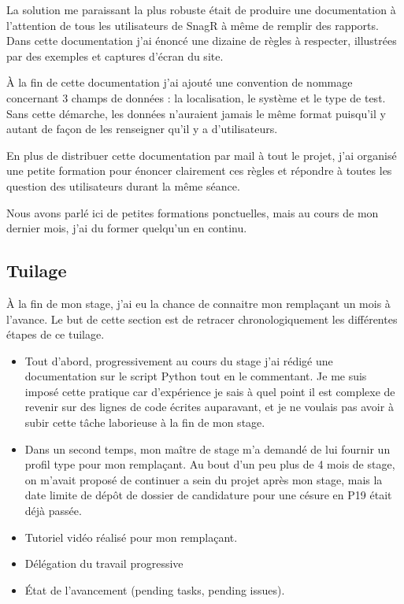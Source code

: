 La solution me paraissant la plus robuste était de produire une documentation à l'attention de tous les utilisateurs de \gls{SnagR} à même de remplir des rapports. 
Dans cette documentation j'ai énoncé une dizaine de règles à respecter, illustrées par des exemples et captures d'écran du site. 

À la fin de cette documentation j'ai ajouté une convention de nommage concernant 3 champs de données : la localisation, le système et le type de test. 
Sans cette démarche, les données n'auraient jamais le même format puisqu'il y autant de façon de les renseigner qu'il y a d'utilisateurs.

En plus de distribuer cette documentation par mail à tout le projet, j'ai organisé une petite formation pour énoncer clairement ces règles et répondre à toutes les question des utilisateurs durant la même séance.

Nous avons parlé ici de petites formations ponctuelles, mais au cours de mon dernier mois, j'ai du former quelqu'un en continu.

\newpage
\subsection{Tuilage}

À la fin de mon stage, j'ai eu la chance de connaitre mon remplaçant un mois à l'avance. Le but de cette section est de retracer chronologiquement les différentes étapes de ce tuilage.

\begin{itemize}
\item Tout d'abord, progressivement au cours du stage j'ai rédigé une documentation sur le script Python tout en le commentant. Je me suis imposé cette pratique car d'expérience je sais à quel point il est complexe de revenir sur des lignes de code écrites auparavant, et je ne voulais pas avoir à subir cette tâche laborieuse à la fin de mon stage.
\item Dans un second temps,  mon maître de stage m'a demandé de lui fournir un profil type pour mon remplaçant. Au bout d'un peu plus de 4 mois de stage, on m'avait proposé de continuer a sein du projet après mon stage, mais la date limite de dépôt de dossier de candidature pour une césure en P19 était déjà passée.
\item Tutoriel vidéo réalisé pour mon remplaçant.
\item Délégation du travail progressive
\item État de l'avancement (pending tasks, pending issues).
\end{itemize}





